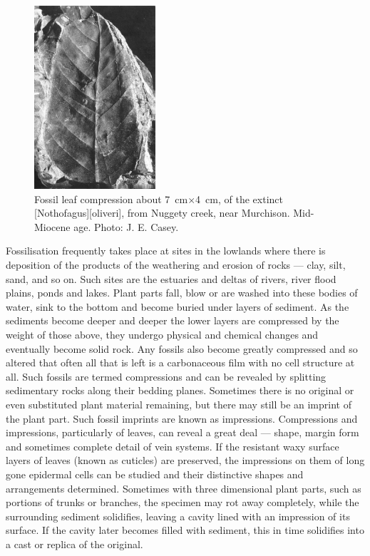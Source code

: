 \begin{figure}
	\includegraphics[width=0.4\textwidth]{graphics/figure121fossil-leaf.jpg}
	\centering
	\caption[Fossil leaf compression]{Fossil leaf compression about \SI{7}{\centi\metre}$\times$\SI{4}{\centi\metre}, of the extinct [Nothofagus][oliveri], from Nuggety creek, near Murchison.
	Mid-Miocene age.
	Photo: J. E. Casey.}%
	\label{fig:121fossil-leaf}
\end{figure}

Fossilisation frequently takes place at sites in the lowlands where there is deposition of the products of the weathering and erosion of rocks --- clay, silt, sand, and so on.
Such sites are the estuaries and deltas of rivers, river flood plains, ponds and lakes.
Plant parts fall, blow or are washed into these bodies of water, sink to the bottom and become buried under layers of sediment.
As the sediments become deeper and deeper the lower layers are compressed by the weight of those above, they undergo physical and chemical changes and eventually become solid rock.
Any fossils also become greatly compressed and so altered that often all that is left is a carbonaceous film with no cell structure at all.
Such fossils are termed compressions and can be revealed by splitting sedimentary rocks along their bedding planes.
Sometimes there is no original or even substituted plant material remaining, but there may still be an imprint of the plant part.
Such fossil imprints are known as impressions.
Compressions and impressions, particularly of leaves, can reveal a great deal --- shape, margin form and sometimes complete detail of vein systems.
If the resistant waxy surface layers of leaves (known as cuticles) are preserved, the impressions on them of long gone epidermal cells can be studied and their distinctive shapes and arrangements determined.
Sometimes with three dimensional plant parts, such as portions of trunks or branches, the specimen may rot away completely, while the surrounding sediment solidifies, leaving a cavity lined with an impression of its surface.
If the cavity later becomes filled with sediment, this in time solidifies into a cast or replica of the original.

